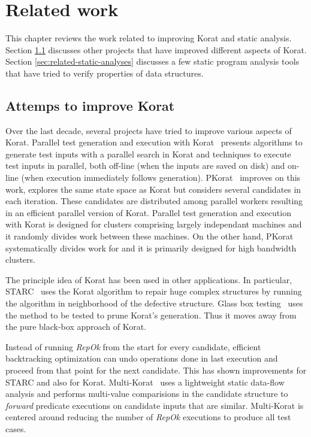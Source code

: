 \chapter{Related work}
\label{ch:related-work}
This chapter reviews the work related to improving Korat and static analysis. Section \ref{sec:attempts-to-improve-korat} discusses other projects that have improved different aspects of Korat. Section \ref{sec:related-static-analyses} discusses a few static program analysis tools that have tried to verify properties of data structures.

\section{Attemps to improve Korat}
\label{sec:attempts-to-improve-korat}
Over the last decade, several projects have tried to improve various
aspects of Korat. Parallel test generation and execution with
Korat~\cite{misailovic2007parallel} presents algorithms to generate
test inputs with a parallel search in Korat and techniques to execute
test inputs in parallel, both off-line (when the inputs are saved on
disk) and on-line (when execution immediately follows
generation). PKorat~\cite{siddiqui2009pkorat} improves on this work,
explores the same state space as Korat but considers several
candidates in each iteration. These candidates are distributed among
parallel workers resulting in an efficient parallel version of
Korat. Parallel test generation and execution with Korat is designed
for clusters comprising largely independant machines and it randomly
divides work between these machines.  On the other hand, PKorat
systematically divides work for and it is primarily designed for high
bandwidth clusters.

The principle idea of Korat has been used in other applications. In
particular, STARC~\cite{elkarablieh2007starc} uses the Korat algorithm
to repair huge complex structures by running the algorithm in
neighborhood of the defective structure. Glass box
testing~\cite{darga2006efficient} uses the method to be tested to
prune Korat’s generation. Thus it moves away from the pure black-box
approach of Korat.

Instead of running \emph{RepOk} from the start for
every candidate, efficient backtracking optimization
\cite{elkarablieh2008efficient} can undo operations done in last
execution and proceed from that point for the next candidate. This has
shown improvements for STARC and also for
Korat. Multi-Korat~\cite{siddiqui2012lightweight} uses a lightweight
static data-flow analysis and performs multi-value comparisions in the
candidate structure to \emph{forward} predicate executions on
candidate inputs that are similar. Multi-Korat is centered around
reducing the number of \emph{RepOk} executions to produce all test
cases.


